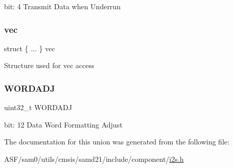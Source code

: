 bit\+: 4 Transmit Data when Underrun \mbox{\label{union_i2_s___s_e_r_c_t_r_l___type_ae258bf6c1b0d102b7139c7882016597f}} 
\subsubsection{\texorpdfstring{vec}{vec}}
{\footnotesize\ttfamily struct \{ ... \}   vec}

Structure used for vec access \mbox{\label{union_i2_s___s_e_r_c_t_r_l___type_a95a99b6b64454354d7e33c0f2033ec1d}} 
\subsubsection{\texorpdfstring{WORDADJ}{WORDADJ}}
{\footnotesize\ttfamily uint32\+\_\+t W\+O\+R\+D\+A\+DJ}

bit\+: 12 Data Word Formatting Adjust 

The documentation for this union was generated from the following file\+:\begin{DoxyCompactItemize}
\item 
A\+S\+F/sam0/utils/cmsis/samd21/include/component/\mbox{\hyperlink{component_2i2s_8h}{i2s.\+h}}\end{DoxyCompactItemize}
